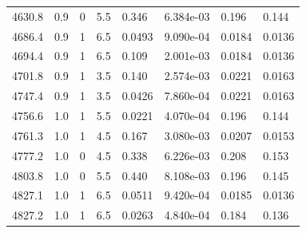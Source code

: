 \documentclass[preview]{standalone}
\begin{document}
{{{\begin{tabular}{L{1.2cm}C{1.2cm} C{0.3cm}C{0.5cm} C{1.4cm}C{1.4cm} C{1.4cm}C{1.4cm}}
  4630.8  &   0.9  & 0     & 5.5 &  0.346  & 6.384e-03  & 0.196 &  0.144   \\ 
  4686.4  &   0.9  & 1     & 6.5 &  0.0493  & 9.090e-04  & 0.0184 &  0.0136   \\ 
  4694.4  &   0.9  & 1     & 6.5 &  0.109  & 2.001e-03  & 0.0184 &  0.0136   \\ 
  4701.8  &   0.9  & 1     & 3.5 &  0.140  & 2.574e-03  & 0.0221 &  0.0163   \\ 
  4747.4  &   0.9  & 1     & 3.5 &  0.0426  & 7.860e-04  & 0.0221 &  0.0163   \\ 
  4756.6  &   1.0  & 1     & 5.5 &  0.0221  & 4.070e-04  & 0.196 &  0.144   \\ 
  4761.3  &   1.0  & 1     & 4.5 &  0.167  & 3.080e-03  & 0.0207 &  0.0153   \\ 
  4777.2  &   1.0  & 0     & 4.5 &  0.338  & 6.226e-03  & 0.208 &  0.153   \\ 
  4803.8  &   1.0  & 0     & 5.5 &  0.440  & 8.108e-03  & 0.196 &  0.145   \\ 
  4827.1  &   1.0  & 1     & 6.5 &  0.0511  & 9.420e-04  & 0.0185 &  0.0136   \\ 
  4827.2  &   1.0  & 1     & 6.5 &  0.0263  & 4.840e-04  & 0.184 &  0.136   \\ 
\hline 
\end{tabular} 

}}}
\end{document}
